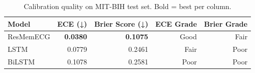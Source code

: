 \begin{table}[h!]
\centering
\caption{Calibration quality on MIT-BIH test set. Bold = best per column.}
\label{tab:calibration}
\begin{tabular}{lrrrr}
\toprule
Model & ECE (↓) & Brier Score (↓) & ECE Grade & Brier Grade \\
\midrule
ResMemECG & \textbf{0.0380} & \textbf{0.1075} & Good & Fair \\
LSTM & 0.0779 & 0.2461 & Fair & Poor \\
BiLSTM & 0.1078 & 0.2581 & Poor & Poor \\
\bottomrule
\end{tabular}
\end{table}